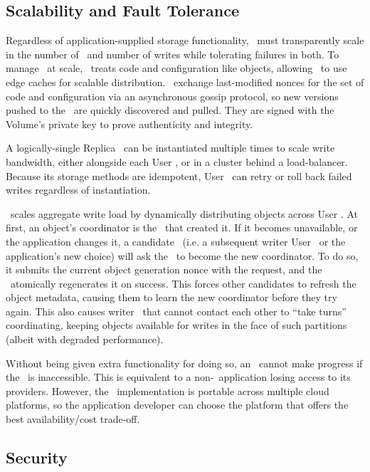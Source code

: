 \subsection{Scalability and Fault Tolerance}
\label{sec:controlplane}

Regardless of application-supplied storage functionality, \Syndicate\ must
transparently scale in the number of \SGs\ and number of writes while tolerating
failures in both.  To manage \SGs\ at scale,
\Syndicate\ treats code and configuration like objects,
allowing \SGs\ to use edge caches for scalable distribution.  \SGs\ exchange
last-modified nonces for the set of code and configuration
via an asynchronous gossip protocol, so new versions pushed to the \MS\ are quickly 
discovered and pulled.  They are signed with the Volume's private key to prove authenticity and integrity.

A logically-single Replica \SG\ can be instantiated multiple times to scale write bandwidth,
either alongside each User \SG, or in a cluster behind a load-balancer.
Because its storage methods are idempotent,
User \SGs\ can retry or roll back failed writes regardless of instantiation.

\Syndicate\ scales aggregate write load by dynamically distributing objects across
User \SGs.  At first, an object's coordinator is the \SG\ that created it.
If it becomes unavailable, or the application changes it, a candidate \SG\
(i.e. a subsequent writer User \SG\ or the application's new choice)
will ask the \MS\ to become the new coordinator.  To do so, it
submits the current object generation nonce with the request, and the \MS\
atomically regenerates it on success.  This forces
other candidates to refresh the object metadata,
causing them to learn the new coordinator before they try again.
This also causes writer \SGs\ that cannot contact each other to ``take turns'' coordinating,
keeping objects available for writes in the face of such partitions (albeit 
with degraded performance).

Without being given extra functionality for doing so, an \SG\ cannot make progress if the \MS\ is inaccessible.
This is equivalent to a non-\Syndicate\ application losing access to its providers.
However, the \MS\ implementation is portable across multiple cloud platforms,
so the application developer can choose the platform that offers the best availability/cost
trade-off.

\subsection{Security}
\label{sec:security}

